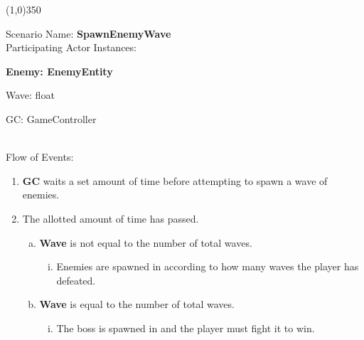 \documentclass[12pt]{article}       %
\begin{document}
\begin{center} \line(1,0){350} \end{center}
Scenario Name: {\bf SpawnEnemyWave} \\
Participating Actor Instances:        \hspace{46pt} {\bf Enemy: EnemyEntity

						\hspace{2.6 in} Wave: float

					          \hspace{2.6 in}   GC: GameController}  \vspace{10pt}  \\ 
Flow of Events: 
\begin{enumerate} 
\item {\bf GC} waits a set amount of time before attempting to spawn a wave of enemies.
\item The allotted amount of time has passed.
	\begin{enumerate} [a.]
	\item {\bf Wave} is not equal to the number of total waves.
		\begin{enumerate} [i.]
		\item Enemies are spawned in according to how many waves the player has defeated.
		\end{enumerate}
	\item {\bf Wave} is equal to the number of total waves.
		\begin{enumerate} [i.]
		\item The boss is spawned in and the player must fight it to win.
		\end{enumerate}
	\end{enumerate}
\end{enumerate}
\end{document}
